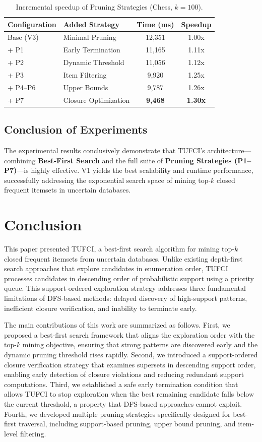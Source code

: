 \documentclass[10pt,letterpaper]{article}
\begin{document}
\begin{table}[H]
\centering
\caption{Incremental speedup of Pruning Strategies (Chess, $k=100$).}
\label{tab:ablation}
\begin{tabular}{llcc}
\hline
\textbf{Configuration} & \textbf{Added Strategy} & \textbf{Time (ms)} & \textbf{Speedup} \\
\hline
Base (V3) & Minimal Pruning & 12,351 & 1.00x \\
+ P1 & Early Termination & 11,165 & 1.11x \\
+ P2 & Dynamic Threshold & 11,056 & 1.12x \\
+ P3 & Item Filtering & 9,920 & 1.25x \\
+ P4--P6 & Upper Bounds & 9,787 & 1.26x \\
+ P7 & Closure Optimization & \textbf{9,468} & \textbf{1.30x} \\
\hline
\end{tabular}
\end{table}

\subsection*{Conclusion of Experiments}
The experimental results conclusively demonstrate that TUFCI's architecture—combining \textbf{Best-First Search} and the full suite of \textbf{Pruning Strategies (P1--P7)}—is highly effective. V1 yields the best scalability and runtime performance, successfully addressing the exponential search space of mining top-$k$ closed frequent itemsets in uncertain databases.

\section*{Conclusion}

This paper presented TUFCI, a best-first search algorithm for mining top-$k$ closed frequent itemsets from uncertain databases. Unlike existing depth-first search approaches that explore candidates in enumeration order, TUFCI processes candidates in descending order of probabilistic support using a priority queue. This support-ordered exploration strategy addresses three fundamental limitations of DFS-based methods: delayed discovery of high-support patterns, inefficient closure verification, and inability to terminate early.

The main contributions of this work are summarized as follows. First, we proposed a best-first search framework that aligns the exploration order with the top-$k$ mining objective, ensuring that strong patterns are discovered early and the dynamic pruning threshold rises rapidly. Second, we introduced a support-ordered closure verification strategy that examines supersets in descending support order, enabling early detection of closure violations and reducing redundant support computations. Third, we established a safe early termination condition that allows TUFCI to stop exploration when the best remaining candidate falls below the current threshold, a property that DFS-based approaches cannot exploit. Fourth, we developed multiple pruning strategies specifically designed for best-first traversal, including support-based pruning, upper bound pruning, and item-level filtering.
\end{document}
